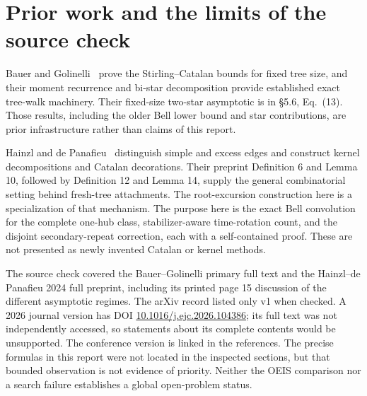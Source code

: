 \documentclass[11pt,letterpaper]{article}
\theoremstyle{remark}\newtheorem{remark}[theorem]{Remark}
\theoremstyle{definition}\newtheorem{definition}[theorem]{Definition}
\begin{document}
\section{Prior work and the limits of the source check}\label{sgm:lw:sec:sources}
Bauer and Golinelli~\cite[\S5.5, Eq.\ (9)]{bg} prove the Stirling--Catalan bounds for fixed tree size, and their moment recurrence and bi-star decomposition provide established exact tree-walk machinery. Their fixed-size two-star asymptotic is in \S5.6, Eq.\ (13). Those results, including the older Bell lower bound and star contributions, are prior infrastructure rather than claims of this report.

Hainzl and de Panafieu~\cite{hdp} distinguish simple and excess edges and construct kernel decompositions and Catalan decorations. Their preprint Definition 6 and Lemma 10, followed by Definition 12 and Lemma 14, supply the general combinatorial setting behind fresh-tree attachments. The root-excursion construction here is a specialization of that mechanism. The purpose here is the exact Bell convolution for the complete one-hub class, stabilizer-aware time-rotation count, and the disjoint secondary-repeat correction, each with a self-contained proof. These are not presented as newly invented Catalan or kernel methods.

The source check covered the Bauer--Golinelli primary full text and the Hainzl--de Panafieu 2024 full preprint, including its printed page 15 discussion of the different asymptotic regimes. The arXiv record listed only v1 when checked. A 2026 journal version has DOI \href{https://doi.org/10.1016/j.ejc.2026.104386}{10.1016/j.ejc.2026.104386}; its full text was not independently accessed, so statements about its complete contents would be unsupported. The conference version is linked in the references. The precise formulas in this report were not located in the inspected sections, but that bounded observation is not evidence of priority. Neither the OEIS comparison nor a search failure establishes a global open-problem status.
\end{document}
